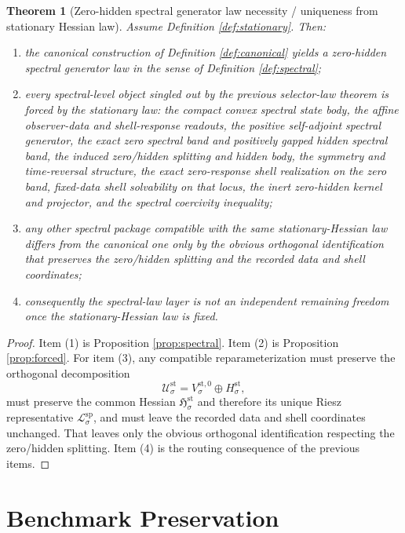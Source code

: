 \documentclass[11pt]{article}
\newcommand{\SpecOp}[1]{\mathcal L_{#1}^{\mathrm{sp}}}
\newcommand{\StatSpace}[1]{\mathcal U_{#1}^{\mathrm{st}}}
\newcommand{\StatZero}[1]{V_{#1}^{\mathrm{st},0}}
\newcommand{\StatHidden}[1]{H_{#1}^{\mathrm{st}}}
\newcommand{\StatHess}[1]{\mathfrak H_{#1}^{\mathrm{st}}}
\newtheorem{theorem}{Theorem}
\begin{document}
\begin{theorem}[Zero-hidden spectral generator law necessity / uniqueness from stationary Hessian law]
\label{thm:necessity}
Assume Definition \ref{def:stationary}. Then:
\begin{enumerate}
    \item the canonical construction of Definition \ref{def:canonical} yields a zero-hidden spectral generator law in the sense of Definition \ref{def:spectral};
    \item every spectral-level object singled out by the previous selector-law theorem is forced by the stationary law: the compact convex spectral state body, the affine observer-data and shell-response readouts, the positive self-adjoint spectral generator, the exact zero spectral band and positively gapped hidden spectral band, the induced zero/hidden splitting and hidden body, the symmetry and time-reversal structure, the exact zero-response shell realization on the zero band, fixed-data shell solvability on that locus, the inert zero-hidden kernel and projector, and the spectral coercivity inequality;
    \item any other spectral package compatible with the same stationary-Hessian law differs from the canonical one only by the obvious orthogonal identification that preserves the zero/hidden splitting and the recorded data and shell coordinates;
    \item consequently the spectral-law layer is not an independent remaining freedom once the stationary-Hessian law is fixed.
\end{enumerate}
\end{theorem}

\begin{proof}
Item (1) is Proposition \ref{prop:spectral}. Item (2) is Proposition \ref{prop:forced}. For item (3), any compatible reparameterization must preserve the orthogonal decomposition
\[
\StatSpace{\sigma}
=
\StatZero{\sigma}\oplus\StatHidden{\sigma},
\]
must preserve the common Hessian \(\StatHess{\sigma}\) and therefore its unique Riesz representative \(\SpecOp{\sigma}\), and must leave the recorded data and shell coordinates unchanged. That leaves only the obvious orthogonal identification respecting the zero/hidden splitting. Item (4) is the routing consequence of the previous items.
\end{proof}

\section{Benchmark Preservation}
\end{document}
